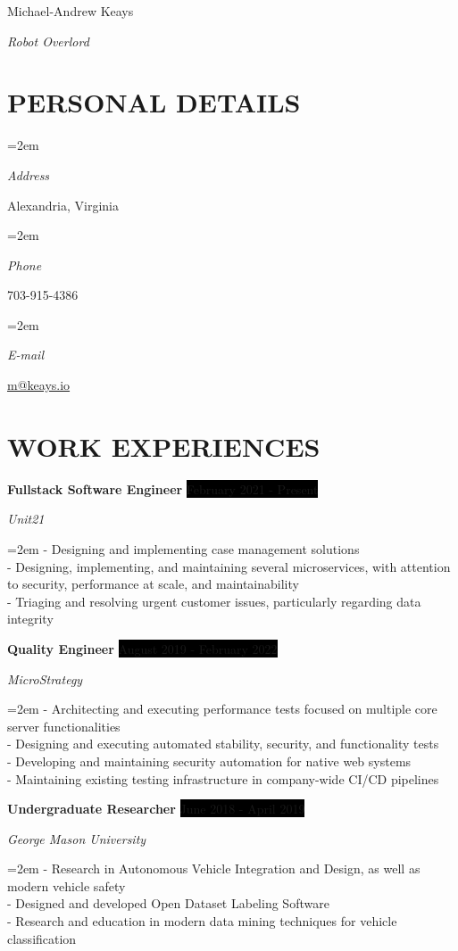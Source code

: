 \documentclass[paper=a4,fontsize=11pt]{scrartcl} %
\newlength{\spacebox}
\newcommand{\sepspace}{\vspace*{1em}}		%
\newcommand{\MyName}[1]{ %
		\Huge \usefont{OT1}{phv}{b}{n} \hfill #1
		\par \normalsize \normalfont}
\newcommand{\MySlogan}[1]{ %
		\large \usefont{OT1}{phv}{m}{n}\hfill \textit{#1}
		\par \normalsize \normalfont}
\newcommand{\NewPart}[1]{\section*{\uppercase{#1}}}
\newcommand{\PersonalEntry}[2]{
		\noindent\hangindent=2em\hangafter=0 %
		\parbox{\spacebox}{        %
		\textit{#1}}		       %
		\hspace{1.5em} #2 \par}    %
\newcommand{\EducationEntry}[4]{
		\noindent \textbf{#1} \hfill      %
		\colorbox{Black}{%
			\parbox{6em}{%
			\hfill\color{White}#2}} \par  %
		\noindent \textit{#3} \par        %
		\noindent\hangindent=2em\hangafter=0 \small #4 %
		\normalsize \par}
\newcommand{\WorkEntry}[4]{				  %
		\noindent \textbf{#1} \hfill      %
		\colorbox{Black}{\color{White}#2} \par  %
		\noindent \textit{#3} \par              %
		\noindent\hangindent=2em\hangafter=0 \small #4 %
		\normalsize \par}
\begin{document}

\MyName{Michael-Andrew Keays}
\MySlogan{Robot Overlord}

\sepspace

\NewPart{Personal details}{}

\PersonalEntry{Address}{Alexandria, Virginia}
\PersonalEntry{Phone}{703-915-4386}
\PersonalEntry{E-mail}{\url{m@keays.io}}

\NewPart{Work Experiences}{}

\WorkEntry
    {Fullstack Software Engineer}
    {February 2021 - Present}
    {Unit21}
    {- Designing and implementing case management solutions\\
    - Designing, implementing, and maintaining several microservices, with attention to security, performance at scale, and maintainability\\
    - Triaging and resolving urgent customer issues, particularly regarding data integrity}

\sepspace

\WorkEntry
    {Quality Engineer}
    {August 2019 - February 2022}
    {MicroStrategy}
    {- Architecting and executing performance tests focused on multiple core server functionalities\\
    - Designing and executing automated stability, security, and functionality tests\\
    - Developing and maintaining security automation for native web systems\\
    - Maintaining existing testing infrastructure in company-wide CI/CD pipelines}

\sepspace

\WorkEntry
    {Undergraduate Researcher}
    {June 2018 - April 2019}
    {George Mason University}
    {- Research in Autonomous Vehicle Integration and Design, as well as modern vehicle safety\\
    - Designed and developed Open Dataset Labeling Software\\
    - Research and education in modern data mining techniques for vehicle classification}
\end{document}
